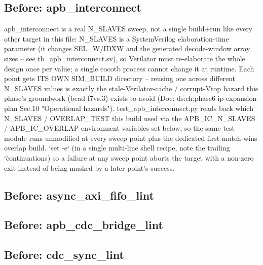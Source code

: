 \begin{record}
\subsection*{Before: apb\_interconnect}

\begin{textblock}
apb_interconnect is a real N_SLAVES sweep, not a single build+run like every other target in
this file: N_SLAVES is a SystemVerilog elaboration-time parameter (it changes SEL_W/IDXW and
the generated decode-window array sizes -- see tb_apb_interconnect.sv), so Verilator must
re-elaborate the whole design once per value; a single cocotb process cannot change it at
runtime. Each point gets ITS OWN SIM_BUILD directory -- reusing one across different N_SLAVES
values is exactly the stale-Verilator-cache / corrupt-Vtop hazard this phase's groundwork
(bead f7vs.3) exists to avoid (Doc: ds:ch:phase6-ip-expansion-plan Sec.10 "Operational hazards").
test_apb_interconnect.py reads back which N_SLAVES / OVERLAP_TEST this build used via the
APB_IC_N_SLAVES / APB_IC_OVERLAP environment variables set below, so the same test module
runs unmodified at every sweep point plus the dedicated first-match-wins overlap build.
`set -e` (in a single multi-line shell recipe, note the trailing `\` continuations) so a
failure at any sweep point aborts the target with a non-zero exit instead of being masked by
a later point's success.
\end{textblock}

\subsection*{Before: async\_axi\_fifo\_lint}


\subsection*{Before: apb\_cdc\_bridge\_lint}


\subsection*{Before: cdc\_sync\_lint}


\end{record}
